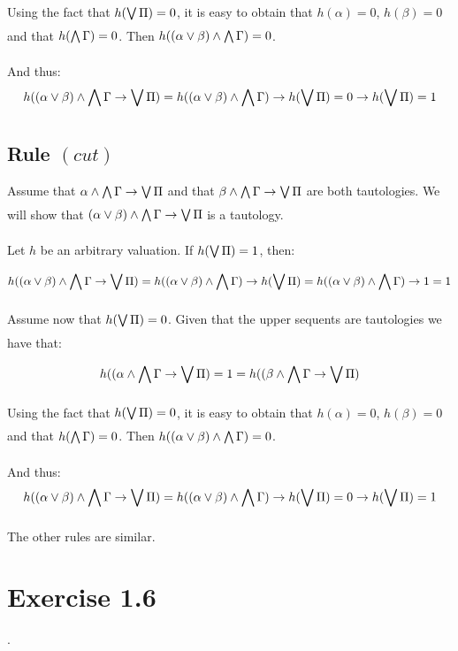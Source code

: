 Using the fact that $h(\bigvee\limits_{\substack{}} \Pi) = 0$, it is easy to obtain that
$h(\alpha) = 0$, $h(\beta) = 0$ and that $h(\bigwedge\limits_{\substack{}} \Gamma) = 0$. Then
$h((\alpha \lor \beta) \land \bigwedge\limits_{\substack{}} \Gamma) = 0$.

And thus:
\begin{equation*}
  h((\alpha \lor \beta) \land \bigwedge\limits_{\substack{}} \Gamma \rightarrow \bigvee\limits_{\substack{}} \Pi) = 
  h((\alpha \lor \beta) \land \bigwedge\limits_{\substack{}} \Gamma) \rightarrow h(\bigvee\limits_{\substack{}} \Pi) = 
  0 \rightarrow h(\bigvee\limits_{\substack{}} \Pi) = 1
\end{equation*}

\subsection*{Rule $(cut)$}

Assume that $\alpha \land \bigwedge\limits_{\substack{}} \Gamma \rightarrow \bigvee\limits_{\substack{}} \Pi$ and that $\beta \land
\bigwedge\limits_{\substack{}} \Gamma \rightarrow \bigvee\limits_{\substack{}} \Pi$ are both tautologies. We will show that
$(\alpha \lor \beta) \land \bigwedge\limits_{\substack{}} \Gamma \rightarrow \bigvee\limits_{\substack{}} \Pi$ is a tautology.

Let $h$ be an arbitrary valuation. If $h(\bigvee\limits_{\substack{}} \Pi) = 1$, then:
\begin{equation*}
  h((\alpha \lor \beta) \land \bigwedge\limits_{\substack{}} \Gamma \rightarrow \bigvee\limits_{\substack{}} \Pi) = 
  h((\alpha \lor \beta) \land \bigwedge\limits_{\substack{}} \Gamma) \rightarrow h(\bigvee\limits_{\substack{}} \Pi) = 
  h((\alpha \lor \beta) \land \bigwedge\limits_{\substack{}} \Gamma) \rightarrow 1 = 1
\end{equation*}

Assume now that $h(\bigvee\limits_{\substack{}} \Pi) = 0$. Given that the upper sequents are
tautologies we have that:

\begin{equation*}
  h((\alpha \land \bigwedge\limits_{\substack{}} \Gamma \rightarrow \bigvee\limits_{\substack{}} \Pi) = 1 = 
  h((\beta \land \bigwedge\limits_{\substack{}} \Gamma \rightarrow \bigvee\limits_{\substack{}} \Pi)
\end{equation*}

Using the fact that $h(\bigvee\limits_{\substack{}} \Pi) = 0$, it is easy to obtain that
$h(\alpha) = 0$, $h(\beta) = 0$ and that $h(\bigwedge\limits_{\substack{}} \Gamma) = 0$. Then
$h((\alpha \lor \beta) \land \bigwedge\limits_{\substack{}} \Gamma) = 0$.

And thus:
\begin{equation*}
  h((\alpha \lor \beta) \land \bigwedge\limits_{\substack{}} \Gamma \rightarrow \bigvee\limits_{\substack{}} \Pi) = 
  h((\alpha \lor \beta) \land \bigwedge\limits_{\substack{}} \Gamma) \rightarrow h(\bigvee\limits_{\substack{}} \Pi) = 
  0 \rightarrow h(\bigvee\limits_{\substack{}} \Pi) = 1
\end{equation*}

The other rules are similar.

\section*{Exercise 1.6}
.
